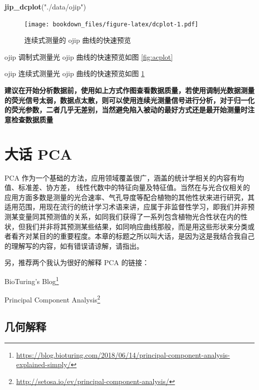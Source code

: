 \documentclass[
]{krantz}
\makeatletter
\newenvironment{Shaded}{\begin{snugshade}}{\end{snugshade}}
\newcommand{\KeywordTok}[1]{\textcolor[rgb]{0.13,0.29,0.53}{\textbf{#1}}}
\newcommand{\NormalTok}[1]{#1}
\newcommand{\StringTok}[1]{\textcolor[rgb]{0.31,0.60,0.02}{#1}}
\renewcommand{\href}[2]{#2\footnote{\url{#1}}}
\newenvironment{kframe}{%
\medskip{}
\setlength{\fboxsep}{.8em}
 \def\at@end@of@kframe{}%
 \ifinner\ifhmode%
  \def\at@end@of@kframe{\end{minipage}}%
  \begin{minipage}{\columnwidth}%
 \fi\fi%
 \def\FrameCommand##1{\hskip\@totalleftmargin \hskip-\fboxsep
 \colorbox{shadecolor}{##1}\hskip-\fboxsep
     \hskip-\linewidth \hskip-\@totalleftmargin \hskip\columnwidth}%
 \MakeFramed {\advance\hsize-\width
   \@totalleftmargin\z@ \linewidth\hsize
   \@setminipage}}%
 {\par\unskip\endMakeFramed%
 \at@end@of@kframe}
\renewenvironment{Shaded}{\begin{kframe}}{\end{kframe}}
\makeatother
\begin{document}
\begin{Shaded}
\begin{Highlighting}[]
\KeywordTok{jip\_dcplot}\NormalTok{(}\StringTok{"./data/ojip"}\NormalTok{)}
\end{Highlighting}
\end{Shaded}

\begin{figure}
\centering
\texttt{[image: bookdown\_files/figure-latex/dcplot-1.pdf]}
\caption{\label{fig:dcplot}连续式测量的 ojip 曲线的快速预览}
\end{figure}

ojip 调制式测量光 ojip 曲线的快速预览如图 \ref{fig:acplot}

ojip 连续式测量光 ojip 曲线的快速预览如图 \ref{fig:dcplot}

\textbf{建议在开始分析数据前，使用如上方式作图查看数据质量，若使用调制光数据测量的荧光信号太弱，数据点太散，则可以使用连续光测量信号进行分析，对于归一化的荧光参数，二者几乎无差别，当然避免陷入被动的最好方式还是最开始测量时注意检查数据质量}

\cleardoublepage

\hypertarget{pca-anylysis}{%
\chapter{大话 PCA}\label{pca-anylysis}}

PCA 作为一个基础的方法，应用领域覆盖很广，涵盖的统计学相关的内容有均值、标准差、协方差， 线性代数中的特征向量及特征值。当然在与光合仪相关的应用方面多数是测量的光合速率、气孔导度等配合植物的其他性状来进行研究，其适用范围，用现在流行的统计学习术语来讲，应属于非监督性学习，即我们并非预测某变量同其预测值的关系，如同我们获得了一系列包含植物光合性状在内的性状，但我们并非将其预测某些结果，如同响应曲线那般，而是用这些形状来分类或者看齐对某目的的重要程度。本章的标题之所以叫大话，是因为这是我结合我自己的理解写的内容，如有错误请谅解，请指出。

另，推荐两个我认为很好的解释 PCA 的链接：

\href{https://blog.bioturing.com/2018/06/14/principal-component-analysis-explained-simply/}{BioTuring's Blog}

\href{http://setosa.io/ev/principal-component-analysis/}{Principal Component Analysis}

\hypertarget{geom-pca}{%
\section{几何解释}\label{geom-pca}}
\end{document}
